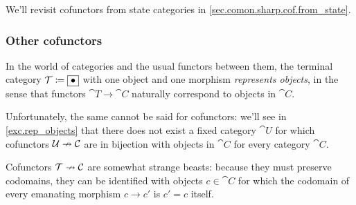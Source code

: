 \documentclass[Book-Poly]{subfiles}
\begin{document}
We'll revisit cofunctors from state categories in \cref{sec.comon.sharp.cof.from_state}.

\subsubsection{Other cofunctors}

\begin{example}\label{ex.rep_objects}
In the world of categories and the usual functors between them, the terminal category $\mathcal{T}\coloneqq\fbox{$\bullet$}$ with one object and one morphism \emph{represents objects}, in the sense that functors $\cat{T}\to\cat{C}$ naturally correspond to objects in $\cat{C}$.

Unfortunately, the same cannot be said for cofunctors: we'll see in \cref{exc.rep_objects} that there does not exist a fixed category $\cat{U}$ for which cofunctors $\mathcal{U}\nrightarrow\mathcal{C}$ are in bijection with objects in $\cat{C}$ for every category $\cat{C}$.

Cofunctors $\mathcal{T}\nrightarrow\mathcal{C}$ are somewhat strange beasts: because they must preserve codomains, they can be identified with objects $c\in\cat{C}$ for which the codomain of every emanating morphism $c\to c'$ is $c'=c$ itself. 
\end{example}
\end{document}
